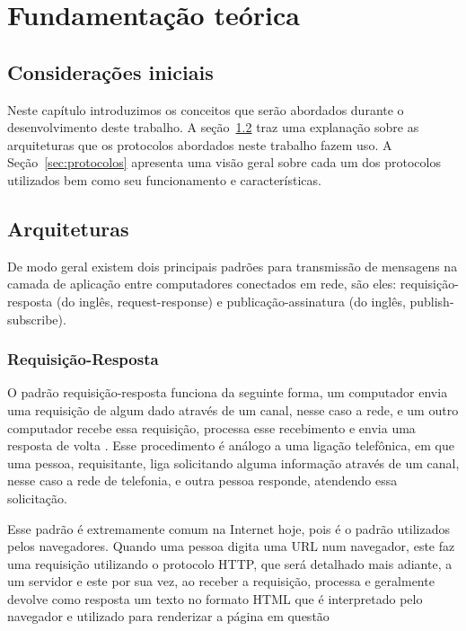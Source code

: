 \chapter{Fundamentação teórica}

\section{Considerações iniciais}
Neste capítulo introduzimos os conceitos que serão abordados durante o desenvolvimento deste trabalho. A seção~\ref{sec:arquiteturas} traz uma explanação sobre as arquiteturas que os protocolos abordados neste trabalho fazem uso. A Seção~\ref{sec:protocolos} apresenta uma visão geral sobre cada um dos protocolos utilizados bem como seu funcionamento e características.

\section{Arquiteturas}
\label{sec:arquiteturas}

De modo geral existem dois principais padrões para transmissão de mensagens na camada de aplicação entre computadores conectados em rede, são eles: requisição-resposta (do inglês, request-response) e publicação-assinatura (do inglês, publish-subscribe).

\subsection{Requisição-Resposta}

O padrão requisição-resposta funciona da seguinte forma, um computador envia uma requisição de algum dado através de um canal, nesse caso a rede, e um outro computador recebe essa requisição, processa esse recebimento e envia uma resposta de volta \cite{livro_hohpe2003_enterpriseIntegrationPattern}. Esse procedimento é análogo a uma ligação telefônica, em que uma pessoa, requisitante, liga solicitando alguma informação através de um canal, nesse caso a rede de telefonia, e outra pessoa responde, atendendo essa solicitação.

Esse padrão é extremamente comum na Internet hoje, pois é o padrão utilizados pelos navegadores. Quando uma pessoa digita uma URL num navegador, este faz uma requisição utilizando o protocolo HTTP, que será detalhado mais adiante, a um servidor e este por sua vez, ao receber a requisição, processa e geralmente devolve como resposta um texto no formato HTML que é interpretado pelo navegador e utilizado para renderizar a página em questão \cite{url_mozilla2018_httpOverview}

